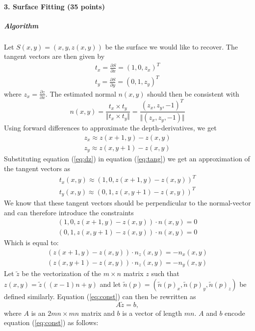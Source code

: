 \documentclass{paper}
\begin{document}
\paragraph{3. Surface Fitting (35 points)}
\subparagraph{Algorithm} 
Let $S(x,y)=(x,y,z(x,y))$ be the surface we would like to recover. The
tangent vectors are then given by 
\begin{equation}
\begin{split}
t_x = \frac{\partial S}{\partial x} = (1, 0, z_x)^T \\
t_y = \frac{\partial S}{\partial y} = (0, 1, z_y)^T
\end{split}
\label{eq:tang}
\end{equation}
where $z_x = \frac{\partial z}{\partial x}$. The estimated normal
$n(x,y)$ should then be consistent with 
\begin{equation}
n(x,y) = \frac{t_x\times t_y}{\Vert t_x\times t_y \Vert} = \frac{(z_x, z_y, -1)^T}{\Vert (z_x, z_y, -1) \Vert}
\end{equation}
Using forward differences to approximate the depth-derivatives, we get
\begin{equation}
\begin{split}
z_x \approx z(x+1,y)-z(x,y) \\
z_y \approx z(x,y+1)-z(x,y)
\end{split}
\label{eq:dz}
\end{equation}
Substituting equation (\ref{eq:dz}) in equation (\ref{eq:tang}) we get an
approximation of the tangent vectors as 
\begin{equation}
\begin{split}
t_x(x,y) \approx (1, 0,  z(x+1,y)-z(x,y) )^T \\
t_y(x,y) \approx  (0, 1, z(x,y+1)-z(x,y))^T
\end{split}
\label{eq:tangAppr}
\end{equation}
We know that these tangent vectors should be perpendicular to the
normal-vector and can therefore introduce the constraints
\begin{equation}
\begin{split}
(1, 0,  z(x+1,y)-z(x,y) ) \cdot n(x,y)=0 \\
 (0, 1, z(x,y+1)-z(x,y))\cdot n(x,y)=0
\end{split}
\end{equation}
Which is equal to:
\begin{equation}
\begin{split}
(z(x+1,y)-z(x,y)) \cdot n_z(x,y)=-n_x(x,y) \\
(z(x,y+1)-z(x,y)) \cdot n_z(x,y)=-n_y(x,y)
\end{split}
\label{eq:const}
\end{equation}
Let $\tilde{z}$ be the vectorization of the $m\times n$ matrix $z$
such that $z(x,y)=\tilde{z}((x-1)n+y)$ and let $\tilde{n}(p)=(\tilde{n}(p)_x,\tilde{n}(p)_y,\tilde{n}(p)_z)$ be
defined similarly. Equation (\ref{eq:const}) can then be rewritten as 
\begin{equation}
A\tilde{z}=b, 
\label{eq:lin}
\end{equation}
where $A$ is an $2mn\times mn$ matrix and $b$ is a vector of length
$mn$. $A$ and $b$ encode equation (\ref{eq:const}) as follows: 
\end{document}
